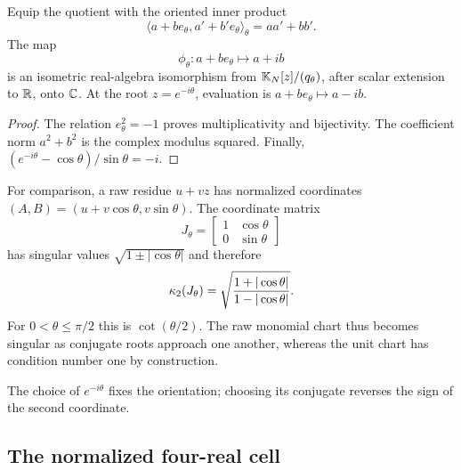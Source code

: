 \begin{proposition}
Equip the quotient with the oriented inner product
\begin{equation}
 \langle a+be_\theta,a'+b'e_\theta\rangle_\theta=aa'+bb'.
 \label{eq:quotient-inner-product}
\end{equation}
The map
\begin{equation}
 \phi_\theta:a+be_\theta\longmapsto a+ib
 \label{eq:complex-chart}
\end{equation}
is an isometric real-algebra isomorphism from
$\mathbb{K}_N[z]/(q_\theta)$, after scalar extension to $\mathbb{R}$, onto $\mathbb{C}$.  At the root
$z=e^{-i\theta}$, evaluation is $a+be_\theta\mapsto a-ib$.
\end{proposition}
\begin{proof}
The relation $e_\theta^2=-1$ proves multiplicativity and bijectivity.
The coefficient norm $a^2+b^2$ is the complex modulus squared.  Finally,
$(e^{-i\theta}-\cos\theta)/\sin\theta=-i$.
\end{proof}

For comparison, a raw residue $u+vz$ has normalized coordinates
$(A,B)=(u+v\cos\theta,v\sin\theta)$.  The coordinate matrix
\begin{equation}
 J_\theta=\begin{bmatrix}1&\cos\theta\\0&\sin\theta\end{bmatrix}
 \label{eq:raw-unit-change}
\end{equation}
has singular values $\sqrt{1\pm|\cos\theta|}$ and therefore
\begin{equation}
 \kappa_2(J_\theta)=
 \sqrt{{1+|\cos\theta|\over1-|\cos\theta|}}.
 \label{eq:raw-condition}
\end{equation}
For $0<\theta\le\pi/2$ this is $\cot(\theta/2)$.  The raw monomial chart thus
becomes singular as conjugate roots approach one another, whereas the unit
chart has condition number one by construction.

The choice of $e^{-i\theta}$ fixes the orientation; choosing its conjugate
reverses the sign of the second coordinate.

\subsection{The normalized four-real cell}

